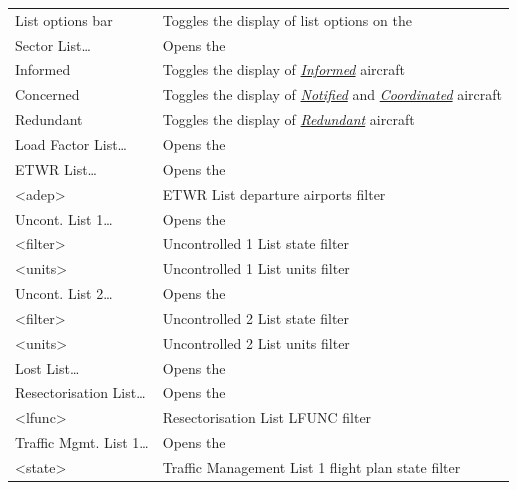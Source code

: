 \documentclass[a4paper,oneside,11pt]{memoir}
\newcommand{\stateref}[1]{\textit{\hyperref[state:#1]{#1}}}
\newcommand{\winref}[1]{\textit{\titleref{#1}}}
\begin{document}
\begin{longtable}{p{5cm} p{7.5cm}}
  List options bar            & Toggles the display of list options on the \winref{menu:global}\\
  Sector List…                & Opens the \winref{list:sector}                                 \\
  Informed                    & Toggles the display of \stateref{Informed} aircraft            \\
  Concerned                   & Toggles the display of \stateref{Notified} and \stateref{Coordinated} aircraft           \\
  Redundant                   & Toggles the display of \stateref{Redundant} aircraft           \\
  Load Factor List…           & Opens the \winref{list:load}                                   \\
  ETWR List…                  & Opens the \winref{list:etwr}                                   \\
  <adep>                      & ETWR List departure airports filter                            \\
  Uncont. List 1…             & Opens the \winref{list:uncon}                                  \\
  <filter>                    & Uncontrolled 1 List state filter                               \\
  <units>                     & Uncontrolled 1 List units filter                               \\
  Uncont. List 2…             & Opens the \winref{list:uncon}                                  \\
  <filter>                    & Uncontrolled 2 List state filter                               \\
  <units>                     & Uncontrolled 2 List units filter                               \\
  Lost List…                  & Opens the \winref{list:lost}                                   \\
  Resectorisation List…       & Opens the \winref{list:resec}                                  \\
  <lfunc>                     & Resectorisation List LFUNC filter                              \\
  Traffic Mgmt. List 1…       & Opens the \winref{list:tml}                                    \\
  <state>                     & Traffic Management List 1 flight plan state filter             \\

\end{longtable}
\end{document}
